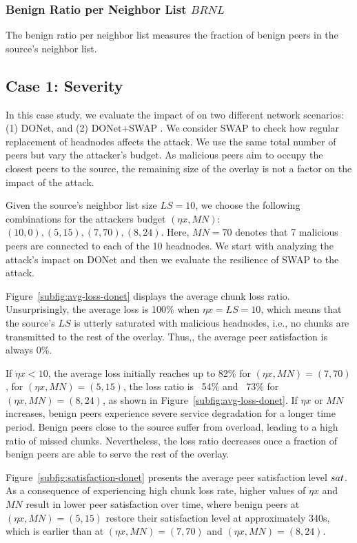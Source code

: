 \subsubsection*{Benign Ratio per Neighbor List $BRNL$} The benign ratio per neighbor list measures the fraction of benign peers in the source's neighbor list.

\subsection{Case 1: \drop Severity}

In this case study, we evaluate the impact of \drop on two different network scenarios:  (1) DONet, and (2) DONet+SWAP \cite{nguyen2016swap}. We consider SWAP to check how regular replacement of headnodes affects the attack. 
We use the same total number of peers but vary the attacker's budget.
As malicious peers aim to occupy the closest peers to the source, the remaining size of the overlay is not a factor on the impact of the \drop attack.

Given the source's neighbor list size $LS=10$, we choose the following combinations for the attackers budget $(\eta x, MN)$: $(10,0), (5,15), (7,70), (8,24)$.
Here, $MN=70$ denotes that 7 malicious peers are connected to each of the 10 headnodes.
We start with analyzing the attack's impact on DONet and then we evaluate the resilience of SWAP to the attack.

Figure~\ref{subfig:avg-loss-donet} displays the average chunk loss ratio.
Unsurprisingly, the average loss is 100\% when $\eta x= LS =10$, which means that the source's $LS$ is utterly saturated with malicious headnodes, i.e., no chunks are transmitted to the rest of the overlay.
Thus,, the average peer satisfaction is always 0\%. 

If $\eta x < 10$, the average loss initially reaches up to 82\% for $(\eta x, MN)=(7, 70)$, for $(\eta x, MN)=(5, 15)$, the loss ratio is ~54\% and ~73\% for $(\eta x, MN)=(8, 24)$, as shown in Figure~\ref{subfig:avg-loss-donet}.
If $\eta x$ or $MN$ increases, benign peers experience severe service degradation for a longer time period. 
Benign peers close to the source suffer from overload, leading to a high ratio of missed chunks. 
Nevertheless, the loss ratio decreases once a fraction of benign peers are able to serve the rest of the overlay.

Figure~\ref{subfig:satisfaction-donet} presents the average peer satisfaction level $sat$.
As a consequence of experiencing high chunk loss rate, higher values of $\eta x$ and $MN$ result in lower peer satisfaction over time, where benign peers at $(\eta x, MN)=(5, 15)$ restore their satisfaction level at approximately 340s, which is earlier than at $(\eta x, MN)=(7, 70)$ and $(\eta x, MN)=(8, 24)$.

